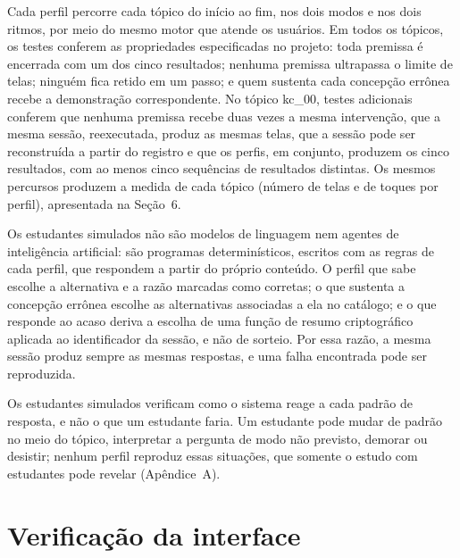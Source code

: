 Cada perfil percorre cada tópico do início ao fim, nos dois modos e nos dois ritmos, por meio do mesmo motor que atende os usuários. Em todos os tópicos, os testes conferem as propriedades especificadas no projeto: toda premissa é encerrada com um dos cinco resultados; nenhuma premissa ultrapassa o limite de telas; ninguém fica retido em um passo; e quem sustenta cada concepção errônea recebe a demonstração correspondente. No tópico kc\_00, testes adicionais conferem que nenhuma premissa recebe duas vezes a mesma intervenção, que a mesma sessão, reexecutada, produz as mesmas telas, que a sessão pode ser reconstruída a partir do registro e que os perfis, em conjunto, produzem os cinco resultados, com ao menos cinco sequências de resultados distintas. Os mesmos percursos produzem a medida de cada tópico (número de telas e de toques por perfil), apresentada na Seção~6.

Os estudantes simulados não são modelos de linguagem nem agentes de inteligência artificial: são programas determinísticos, escritos com as regras de cada perfil, que respondem a partir do próprio conteúdo. O perfil que sabe escolhe a alternativa e a razão marcadas como corretas; o que sustenta a concepção errônea escolhe as alternativas associadas a ela no catálogo; e o que responde ao acaso deriva a escolha de uma função de resumo criptográfico aplicada ao identificador da sessão, e não de sorteio. Por essa razão, a mesma sessão produz sempre as mesmas respostas, e uma falha encontrada pode ser reproduzida.

Os estudantes simulados verificam como o sistema reage a cada padrão de resposta, e não o que um estudante faria. Um estudante pode mudar de padrão no meio do tópico, interpretar a pergunta de modo não previsto, demorar ou desistir; nenhum perfil reproduz essas situações, que somente o estudo com estudantes pode revelar (Apêndice~A).

\section{Verificação da interface}

